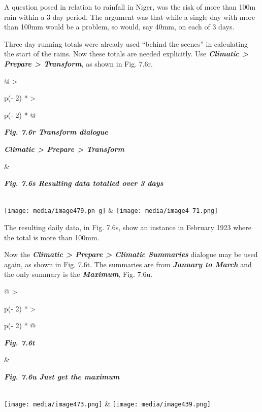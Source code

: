 \documentclass[
  letterpaper,
  DIV=11,
  numbers=noendperiod]{scrreprt}
\begin{document}
A question posed in relation to rainfall in Niger, was the risk of more
than 100m rain within a 3-day period. The argument was that while a
single day with more than 100mm would be a problem, so would, say 40mm,
on each of 3 days.

Three day running totals were already used ``behind the scenes'' in
calculating the start of the rains. Now these totals are needed
explicitly. Use \textbf{\emph{Climatic \textgreater{} Prepare
\textgreater{} Transform}}, as shown in Fig. 7.6r.

\begin{longtable}[]{@{}
  >{\raggedright\arraybackslash}p{(\columnwidth - 2\tabcolsep) * }
  >{\raggedright\arraybackslash}p{(\columnwidth - 2\tabcolsep) * }@{}}
\toprule\noalign{}
\begin{minipage}[b]{\linewidth}\raggedright
\textbf{\emph{Fig. 7.6r Transform dialogue}}

\textbf{\emph{Climatic \textgreater{} Prepare \textgreater{} Transform}}
\end{minipage} & \begin{minipage}[b]{\linewidth}\raggedright
\textbf{\emph{Fig. 7.6s Resulting data totalled over 3 days}}
\end{minipage} \\
\midrule\noalign{}
\endhead
\bottomrule\noalign{}
\endlastfoot
\texttt{[image: media/image479.pn g]}
&
\texttt{[image: media/image4 71.png]} \\
\end{longtable}

The resulting daily data, in Fig. 7.6s, show an instance in February
1923 where the total is more than 100mm.

Now the \textbf{\emph{Climatic \textgreater{} Prepare \textgreater{}
Climatic Summaries}} dialogue may be used again, as shown in Fig. 7.6t.
The summaries are from \textbf{\emph{January to March}} and the only
summary is the \textbf{\emph{Maximum}}, Fig. 7.6u.

\begin{longtable}[]{@{}
  >{\raggedright\arraybackslash}p{(\columnwidth - 2\tabcolsep) * }
  >{\raggedright\arraybackslash}p{(\columnwidth - 2\tabcolsep) * }@{}}
\toprule\noalign{}
\begin{minipage}[b]{\linewidth}\raggedright
\textbf{\emph{Fig. 7.6t}}
\end{minipage} & \begin{minipage}[b]{\linewidth}\raggedright
\textbf{\emph{Fig. 7.6u Just get the maximum}}
\end{minipage} \\
\midrule\noalign{}
\endhead
\bottomrule\noalign{}
\endlastfoot
\texttt{[image: media/image473.png]} &
\texttt{[image: media/image439.png]} \\
\end{longtable}
\end{document}
